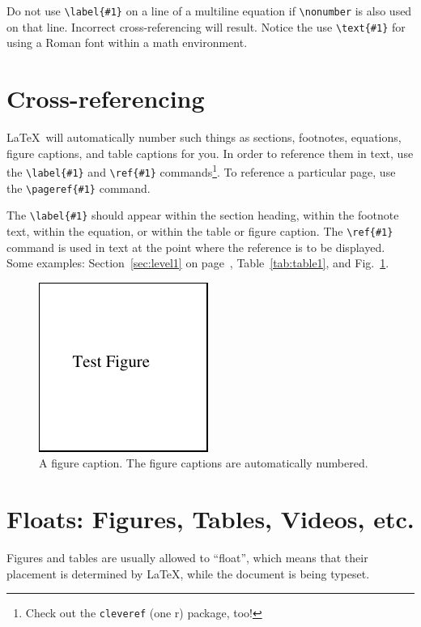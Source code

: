 \documentclass[]{article}
\begin{document}
Do not use \verb+\label{#1}+ on a line of a multiline
equation if \verb+\nonumber+ is also used on that line. Incorrect
cross-referencing will result. Notice the use \verb+\text{#1}+ for
using a Roman font within a math environment.

\section{Cross-referencing}
\LaTeX\ will automatically number such things as
sections, footnotes, equations, figure captions, and table captions for you. 
In order to reference them in text, use the
\verb+\label{#1}+ and \verb+\ref{#1}+ commands\footnote{Check out the \texttt{cleveref} (one r) package, too!}. 
To reference a particular page, use the \verb+\pageref{#1}+ command.

The \verb+\label{#1}+ should appear 
within the section heading, 
within the footnote text, 
within the equation, or 
within the table or figure caption. 
The \verb+\ref{#1}+ command
is used in text at the point where the reference is to be displayed.  
Some examples: Section~\ref{sec:level1} on page~\pageref{sec:level1},
Table~\ref{tab:table1}, and Fig.~\ref{fig:epsart}.
\begin{figure}[b]
  \centering
  \includegraphics{fig_1}%
  \caption{\label{fig:epsart} A figure caption. The figure captions are
automatically numbered.}
\end{figure}

\section{Floats: Figures, Tables, Videos, etc.}
Figures and tables are usually allowed to ``float'', which means that their
placement is determined by \LaTeX, while the document is being typeset. 
\end{document}
